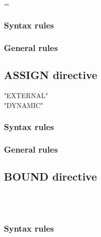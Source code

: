 \begin{syntax}[\miscextcolour]
  \begin{1=}
     \\
  \end{1=}
  \literal = \literal
\end{syntax}

\subsubsection{Syntax rules}

\subsubsection{General rules}

\subsection{ASSIGN directive}

\begin{syntax}[\miscextcolour]
  \begin{1=}
    "EXTERNAL" \\
    "DYNAMIC"
  \end{1=}
\end{syntax}

\subsubsection{Syntax rules}

\subsubsection{General rules}

\subsection{BOUND directive}

\begin{syntax}[\miscextcolour]
  \begin{1=}
     \\
     \\
  \end{1=}
\end{syntax}

\subsubsection{Syntax rules}

